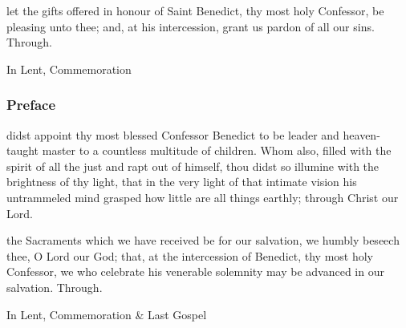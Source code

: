 
\secret
{} let the gifts offered in honour of Saint Benedict, thy most holy Confessor, be pleasing unto thee; and, at his intercession, grant us pardon of all our sins. Through.
\begin{rubric}
    In Lent, Commemoration 
\end{rubric}

\subsubsection{Preface}
 didst appoint thy most blessed Confessor Benedict to be leader and heaven-taught master to a countless multitude of children. Whom also, filled with the spirit of all the just and rapt out of himself, thou didst so illumine with the brightness of thy light, that in the very light of that intimate vision his untrammeled mind grasped how little are all things earthly; through Christ our Lord.


\postcommunion
 the Sacraments which we have received be for our salvation, we humbly beseech thee, O Lord our God; that, at the intercession of Benedict, thy most holy Confessor, we who celebrate his venerable solemnity may be advanced in our salvation. Through.
\begin{rubric}
    In Lent, Commemoration \& Last Gospel 
\end{rubric}



